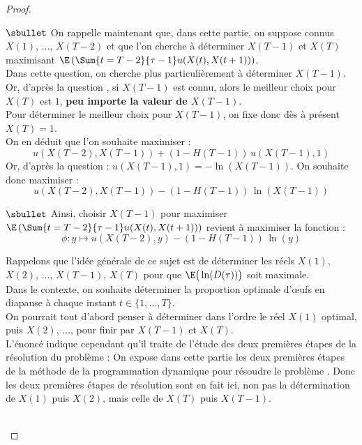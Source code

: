 \documentclass[11pt]{article}%
\begin{document}
\begin{proof}
\begin{noliste}{}
	\item[$\sbullet$] On rappelle maintenant que, dans cette partie, 
	on 
	suppose connus $X(1)$, $\ldots$, $X(T-2)$ et que l'on 
	cherche à déterminer $X(T-1)$ et $X(T)$ maximisant 
	$\E\left(\Sum{t=T-2}{\tau -1} u(X(t),X(t+1))\right)$.\\
	Dans cette question, on cherche plus particulièrement à 
	déterminer $X(T-1)$.\\
	Or, d'après la question , si $X(T-1)$ est connu,
	alors le meilleur choix pour $X(T)$ est $1$, {\bf peu 
	importe la valeur de $X(T-1)$}.\\
	Pour déterminer le meilleur choix pour $X(T-1)$, on fixe donc 
	dès à présent $X(T)=1$.\\
	On en déduit que l'on souhaite maximiser :
	\[
	  u(X(T-2),X(T-1)) + (1-H(T-1)) \, u(X(T-1),1)
	\]
	Or, d'après la question  : $u(X(T-1),1) = 
	-\ln(X(T-1))$. On souhaite donc maximiser :
	\[
	  u(X(T-2),X(T-1)) - (1- H(T-1)) \, \ln(X(T-1))
	\]
	
	\item[$\sbullet$] Ainsi, choisir $X(T-1)$ pour maximiser 
	$\E\left( 
	\Sum{t=T-2}{\tau -1} u(X(t),X(t+1))\right)$ revient à maximiser 
	la fonction :
	\[
	  \phi : y \mapsto u(X(T-2),y) - (1-H(T-1)) \, \ln(y)
	\]
      \end{noliste}
      
      
      \newpage
      
      
      \begin{remark}
        Rappelons que l'idée générale de ce sujet est de déterminer 
        les réels $X(1)$, $X(2)$, $\ldots$, $X(T-1)$, $X(T)$ pour 
        que $\E\big(\ln(D(\tau))\big)$ soit maximale.\\
        Dans le contexte, on souhaite déterminer la proportion optimale 
	d'{\oe}ufs en diapause à chaque instant $t \in \{1, \ldots, 
	T\}$.\\
	On pourrait tout d'abord penser à déterminer dans l'ordre le 
	réel $X(1)$ optimal, puis $X(2)$, $\ldots$, pour finir par 
	$X(T-1)$ et $X(T)$. \\
	L'énoncé indique cependant qu'il traite de 
	l'étude des deux premières étapes de la résolution du 
	problème : \og On expose dans cette partie les deux 
	premières étapes de la méthode de la programmation dynamique
	pour résoudre le problème \fg{}.
	Donc les deux premières étapes de résolution sont en fait ici,
	non pas la détermination de $X(1)$ puis $X(2)$, mais celle de 
	$X(T)$ puis $X(T-1)$.
      \end{remark}~\\[-1.4cm]
    \end{proof}
\end{document}
